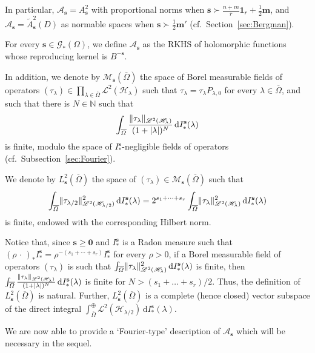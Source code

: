 \documentclass[10.5pt,reqno]{amsart}
\newcommand{\vect}[1]{\mathbf{{#1}}}
\newcommand{\dd}{\mathrm{d}}
\DeclarePairedDelimiter{\abs}{\lvert}{\rvert}
\DeclarePairedDelimiter{\norm}{\lVert}{\rVert}
\newcommand{\Ms}{\mathscr{M}}
\newcommand{\N}{\mathds{N}}
\newcommand{\Hs}{\mathscr{H}}
\newcommand{\Ac}{\mathcal{A}}
\newcommand{\Gc}{\mathcal{G}}
\newcommand{\Meg}{\geqslant}
\newcommand{\Lin}{\mathscr{L}}
\begin{document}
In particular, $\Ac_{\vect s}=A^2_{\vect s}$ with proportional norms when $\vect s\succ \frac{n+m}{r}\vect 1_r+\frac 1 2 \vect m$, and $\Ac_{\vect s}=\widetilde A^{2}_{\vect s}(D)$ as normable spaces when $\vect s\succ \frac{1}{2}\vect{m'}$ (cf.~Section~\ref{sec:Bergman}).



\begin{deff}
	For every $\vect s\in \Gc_*(\Omega)$, we define $\Ac_{\vect s}$ as the RKHS of holomorphic functions whose reproducing kernel is $B^{-\vect s}$.
	
	In addition, we denote by $\Ms_{\vect s}(\overline \Omega)$ the space of Borel measurable fields of operators $(\tau_\lambda)\in \prod_{\lambda\in \overline \Omega} \Lin^2(\Hs_\lambda)$ such that $\tau_\lambda=\tau_\lambda P_{\lambda,0}$ for every $\lambda\in \overline \Omega$, and such that there is $N\in\N$ such that
	\[
	\int_{\overline \Omega} \frac{\norm{\tau_\lambda}_{\Lin^2(\Hs_\lambda)}}{(1+\abs{\lambda})^N}\,\dd I_*^{\vect s}(\lambda)
	\]
	is finite, modulo the space of $I_*^{\vect s}$-negligible fields of operators (cf.~Subsection~\ref{sec:Fourier}).
	
	We denote by $L^2_{\vect s}(\overline \Omega)$ the space of $(\tau_\lambda)\in \Ms_{\vect s}(\overline \Omega)$ such that
	\[
	\int_{\overline \Omega} \norm{\tau_{\lambda/2}}_{\Lin^2(\Hs_{\lambda/2})}^2\,\dd I_*^{\vect s}(\lambda)=2^{s_1+\cdots+s_r}\int_{\overline \Omega} \norm{\tau_{\lambda}}_{\Lin^2(\Hs_{\lambda})}^2\,\dd I_*^{\vect s}(\lambda)
	\]
	is finite, endowed with the corresponding Hilbert norm.
\end{deff}

Notice that, since $\vect s \Meg \vect 0$ and $I_*^{\vect s}$ is a Radon measure such that $(\rho\,\cdot\,)_* I_*^{\vect s}= \rho^{-(s_1+\cdots+s_r)} I_*^{\vect s}$ for every $\rho>0$,   if a Borel measurable field of operators $(\tau_\lambda)$ is such that $\int_{\overline \Omega} \norm{\tau_\lambda}_{\Lin^2(\Hs_\lambda)}^2\,\dd I_*^{\vect s}(\lambda)$ is finite, then $\int_{\overline \Omega} \frac{\norm{\tau_\lambda}_{\Lin^2(\Hs_\lambda)}}{(1+\abs{\lambda})^N}\,\dd I_*^{\vect s}(\lambda)$ is finite for $N>(s_1+\dots+s_r)/2$. Thus, the definition of $L^2_{\vect s}(\overline \Omega)$ is natural. Further, $L^2_{\vect s}(\overline \Omega)$ is a complete (hence closed) vector subspace of the direct integral $\int_{\overline \Omega}^\oplus \Lin^2(\Hs_{\lambda/2})\,\dd I^{\vect s}_*(\lambda)$.

We are now able to provide a `Fourier-type' description of $\Ac_{\vect s}$ which will be necessary in the sequel.
\end{document}
